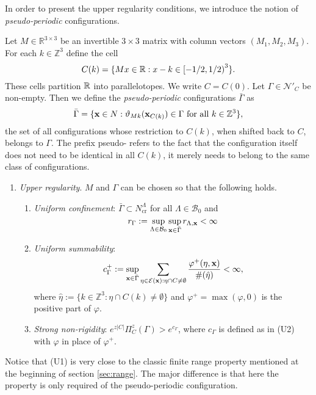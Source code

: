 In order to present the upper regularity conditions, we introduce the notion of \textit{pseudo-periodic} configurations. 

Let $M\in\mathbb R^{3\times 3}$ be an invertible $3\times 3$ matrix with column vectors $(M_1,M_2,M_3)$. For each $k \in \mathbb Z^3$ define the cell
$$C(k) =  \{Mx \in \mathbb{R}: x-k \in \left[ -1/2, 1/2 \right)^3 \}.$$
These cells partition $\mathbb{R}$ into parallelotopes. We write $C=C(0)$. Let $\Gamma \in \mathcal N'_C$ be non-empty. Then we define the \textit{pseudo-periodic} configurations $\bar \Gamma$ as
$$\bar \Gamma = \{ {\mathbf{x}} \in N: \vartheta_{Mk}({\mathbf{x}}_{C(k)}) \in \Gamma \text{ for all } k \in \mathbb Z^3 \},$$
the set of all configurations whose restriction to $C(k)$, when shifted back to $C$, belongs to $\Gamma$. The prefix pseudo- refers to the fact that the configuration itself does not need to be identical in all $C(k)$, it merely needs to belong to the same class of configurations.

\begin{enumerate}[\textbf{(U)}] 
	\item \textit{Upper regularity}. $M$ and $\Gamma$ can be chosen so that the following holds. 
		\begin{enumerate}[(U1)]
			\item \textit{Uniform confinement}: $\bar \Gamma \subset N^\Lambda_\text{cr}$ for all $\Lambda \in \mathcal B_0$ and 
			\begin{equation}\label{eq:U1}r_\Gamma := \sup_{\Lambda\in\mathcal B_0}\sup_{{\mathbf{x}} \in \bar\Gamma} r_{\Lambda, {\mathbf{x}}} < \infty\end{equation}
			\item \textit{Uniform summability}: 
			$$c^+_\Gamma := \sup_{{\mathbf{x}} \in \bar\Gamma}  \sum_{\eta \in \mathcal E({\mathbf{x}}): \eta \cap C \neq \emptyset} \frac{\varphi^+(\eta,{\mathbf{x}})}{\#(\hat\eta)} < \infty,$$
where $\hat\eta := \{k \in \mathbb Z^3: \eta \cap C(k) \neq \emptyset\}$ and $\varphi^+ = \max(\varphi,0)$ is the positive part of $\varphi$.
\item \textit{Strong non-rigidity}: $e^{z|C|} \Pi^z_C(\Gamma) > e^{c_\Gamma}$, where $c_\Gamma$ is defined as in (U2) with $\varphi$ in place of $\varphi^+$.
		\end{enumerate}
\end{enumerate}

Notice that (U1) is very close to the classic finite range property mentioned at the beginning of section \ref{sec:range}. The major difference is that here the property is only required of the pseudo-periodic configuration.

